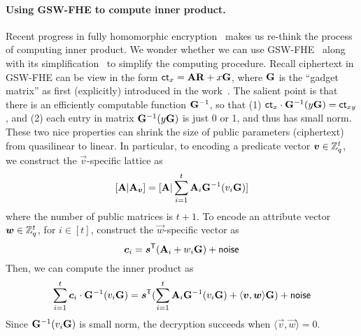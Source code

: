 \paragraph{Using GSW-FHE to compute inner product.} Recent progress in fully homomorphic encryption~\cite{C:GenSahWat13} makes us re-think the process of computing inner product. We wonder whether we can use GSW-FHE~\cite{C:GenSahWat13} along with its simplification~\cite{C:AlpPei14} to simplify the computing procedure. Recall ciphertext in GSW-FHE can be view in the form $\mathsf{ct}_x = \mathbf{A} \mathbf{R} + x \mathbf{G}$, where $\mathbf{G}$ is the ``gadget matrix'' as first (explicitly) introduced in the work~\cite{EC:MicPei12}. The salient point is that there is an efficiently computable function $\mathbf{G}^{-1}$, so that (1) $\mathsf{ct}_x \cdot \mathbf{G}^{-1}(y \mathbf{G}) = \mathsf{ct}_{xy}$, and (2) each entry in matrix $\mathbf{G}^{-1}(y \mathbf{G})$ is just 0 or 1, and thus has small norm. These two nice properties can shrink the size of public parameters (ciphertext) from quasilinear to linear. In particular, to encoding a predicate vector $\boldsymbol{v} \in \mathbb{Z}_q^t$, we construct the $\vec{v}$-specific lattice as
$$[\mathbf{A} | \mathbf{A}_{\boldsymbol{v}}] = [\mathbf{A} | \sum_{i = 1}^t  \mathbf{A}_{i} \mathbf{G}^{-1}(v_i \mathbf{G})]$$
where the number of public matrices is $t + 1$. To encode an attribute vector $\boldsymbol{w} \in \mathbb{Z}_q^{t}$, for $i \in [t]$, construct the $\vec{w}$-specific vector as
$$\boldsymbol{c}_i = \boldsymbol{s}^{\mathsf{T}} ( \mathbf{A}_i +  w_i \mathbf{G}) + \mathsf{noise}$$
Then, we can compute the inner product as
$$\sum_{i = 1}^t \boldsymbol{c}_i \cdot \mathbf{G}^{-1}(v_i \mathbf{G}) = \boldsymbol{s}^{\mathsf{T}} (\sum_{i = 1}^t  \mathbf{A}_{i} \mathbf{G}^{-1}(v_i \mathbf{G}) + \langle \boldsymbol{v}, \boldsymbol{w} \rangle \mathbf{G}) +  \mathsf{noise}$$
Since $\mathbf{G}^{-1}(v_i \mathbf{G})$ is small norm, the decryption succeeds when $\langle \vec{v}, \vec{w} \rangle = 0$.

